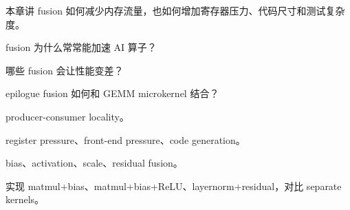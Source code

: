 {本章讲 fusion 如何减少内存流量，也如何增加寄存器压力、代码尺寸和测试复杂度。}
{\item fusion 为什么常常能加速 AI 算子？
\item 哪些 fusion 会让性能变差？
\item epilogue fusion 如何和 GEMM microkernel 结合？}
{\item producer-consumer locality。
\item register pressure、front-end pressure、code generation。
\item bias、activation、scale、residual fusion。}
{实现 matmul+bias、matmul+bias+ReLU、layernorm+residual，对比 separate kernels。}

